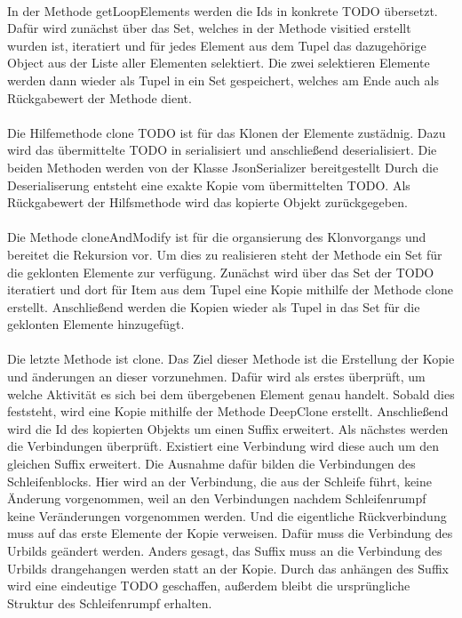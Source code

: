 \documentclass{article}
\begin{document}
    \\
    In der Methode getLoopElements werden die Ids in konkrete TODO übersetzt.
    Dafür wird zunächst über das Set, welches in der Methode visitied erstellt wurden ist, iteratiert und für jedes Element aus dem Tupel das dazugehörige Object aus der Liste aller Elementen selektiert.
    Die zwei selektieren Elemente werden dann wieder als Tupel in ein Set gespeichert, welches am Ende auch als Rückgabewert der Methode dient.\\
    \\
    Die Hilfemethode clone TODO ist für das Klonen der Elemente zustädnig. Dazu wird das übermittelte TODO in serialisiert und anschließend deserialisiert.
    Die beiden Methoden werden von der Klasse JsonSerializer bereitgestellt
    Durch die Deserialiserung entsteht eine exakte Kopie vom übermittelten TODO.
    Als Rückgabewert der Hilfsmethode wird das kopierte Objekt zurückgegeben.\\
    \\
    Die Methode cloneAndModify ist für die organsierung des Klonvorgangs und bereitet die Rekursion vor.
    Um dies zu realisieren steht der Methode ein Set für die geklonten Elemente zur verfügung.
    Zunächst wird über das Set der TODO iteratiert und dort für Item aus dem Tupel eine Kopie mithilfe der Methode clone erstellt.
    Anschließend werden die Kopien wieder als Tupel in das Set für die geklonten Elemente hinzugefügt.\\
    \\
    Die letzte Methode ist clone.
    Das Ziel dieser Methode ist die Erstellung der Kopie und änderungen an dieser vorzunehmen.
    Dafür wird als erstes überprüft, um welche Aktivität es sich bei dem übergebenen Element genau handelt.
    Sobald dies feststeht, wird eine Kopie mithilfe der Methode DeepClone erstellt.
    Anschließend wird die Id des kopierten Objekts um einen Suffix erweitert.
    Als nächstes werden die Verbindungen überprüft. 
    Existiert eine Verbindung wird diese auch um den gleichen Suffix erweitert.
    Die Ausnahme dafür bilden die Verbindungen des Schleifenblocks.
    Hier wird an der Verbindung, die aus der Schleife führt, keine Änderung vorgenommen, weil an den Verbindungen nachdem Schleifenrumpf keine Veränderungen vorgenommen werden.
    Und die eigentliche Rückverbindung muss auf das erste Elemente der Kopie verweisen. 
    Dafür muss die Verbindung des Urbilds geändert werden.
    Anders gesagt, das Suffix muss an die Verbindung des Urbilds drangehangen werden statt an der Kopie.
    Durch das anhängen des Suffix wird eine eindeutige TODO geschaffen, außerdem bleibt die ursprüngliche Struktur des Schleifenrumpf erhalten.\\
\end{document}
